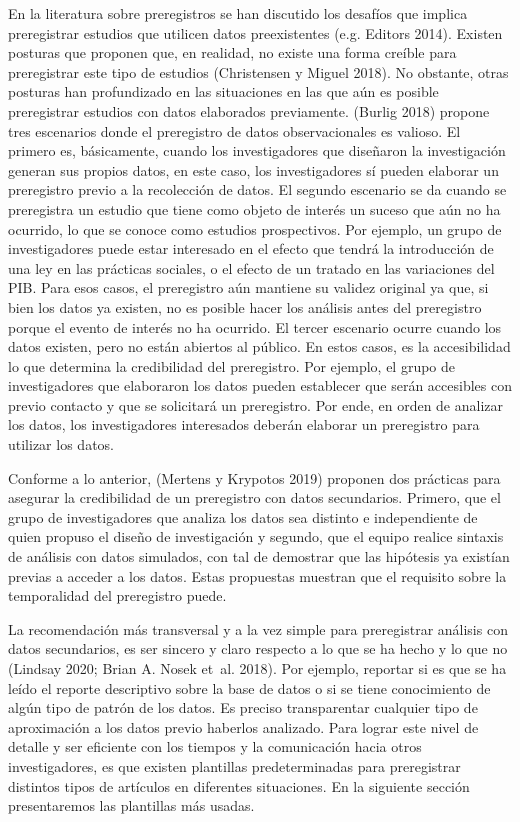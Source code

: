 \documentclass[
  spanish,
  letterpaper,
  DIV=11,
  numbers=noendperiod]{scrreprt}
\begin{document}
En la literatura sobre preregistros se han discutido los desafíos que
implica preregistrar estudios que utilicen datos preexistentes (e.g.
Editors 2014). Existen posturas que proponen que, en realidad, no existe
una forma creíble para preregistrar este tipo de estudios (Christensen y
Miguel 2018). No obstante, otras posturas han profundizado en las
situaciones en las que aún es posible preregistrar estudios con datos
elaborados previamente. (Burlig 2018) propone tres escenarios donde el
preregistro de datos observacionales es valioso. El primero es,
básicamente, cuando los investigadores que diseñaron la investigación
generan sus propios datos, en este caso, los investigadores sí pueden
elaborar un preregistro previo a la recolección de datos. El segundo
escenario se da cuando se preregistra un estudio que tiene como objeto
de interés un suceso que aún no ha ocurrido, lo que se conoce como
estudios prospectivos. Por ejemplo, un grupo de investigadores puede
estar interesado en el efecto que tendrá la introducción de una ley en
las prácticas sociales, o el efecto de un tratado en las variaciones del
PIB. Para esos casos, el preregistro aún mantiene su validez original ya
que, si bien los datos ya existen, no es posible hacer los análisis
antes del preregistro porque el evento de interés no ha ocurrido. El
tercer escenario ocurre cuando los datos existen, pero no están abiertos
al público. En estos casos, es la accesibilidad lo que determina la
credibilidad del preregistro. Por ejemplo, el grupo de investigadores
que elaboraron los datos pueden establecer que serán accesibles con
previo contacto y que se solicitará un preregistro. Por ende, en orden
de analizar los datos, los investigadores interesados deberán elaborar
un preregistro para utilizar los datos.

Conforme a lo anterior, (Mertens y Krypotos 2019) proponen dos prácticas
para asegurar la credibilidad de un preregistro con datos secundarios.
Primero, que el grupo de investigadores que analiza los datos sea
distinto e independiente de quien propuso el diseño de investigación y
segundo, que el equipo realice sintaxis de análisis con datos simulados,
con tal de demostrar que las hipótesis ya existían previas a acceder a
los datos. Estas propuestas muestran que el requisito sobre la
temporalidad del preregistro puede.

La recomendación más transversal y a la vez simple para preregistrar
análisis con datos secundarios, es ser sincero y claro respecto a lo que
se ha hecho y lo que no (Lindsay 2020; Brian A. Nosek et~al. 2018). Por
ejemplo, reportar si es que se ha leído el reporte descriptivo sobre la
base de datos o si se tiene conocimiento de algún tipo de patrón de los
datos. Es preciso transparentar cualquier tipo de aproximación a los
datos previo haberlos analizado. Para lograr este nivel de detalle y ser
eficiente con los tiempos y la comunicación hacia otros investigadores,
es que existen plantillas predeterminadas para preregistrar distintos
tipos de artículos en diferentes situaciones. En la siguiente sección
presentaremos las plantillas más usadas.
\end{document}

